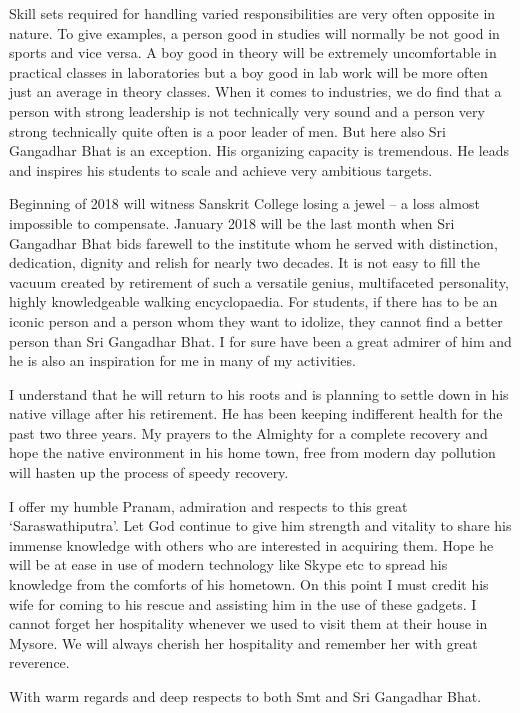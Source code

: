 Skill sets required for handling varied responsibilities are very often opposite in nature. To give examples, a person good in studies will normally be not good in sports and vice versa. A boy good in theory will be extremely uncomfortable in practical classes in laboratories but a boy good in lab work will be more often just an average in theory classes. When it comes to industries, we do find that a person with strong leadership is not technically very sound and a person very strong technically quite often is a poor leader of men. But here also Sri Gangadhar Bhat is an exception. His organizing capacity is tremendous. He leads and inspires his students to scale and achieve very ambitious targets.

Beginning of 2018 will witness Sanskrit College losing a jewel – a loss almost impossible to compensate. January 2018 will be the last month when Sri Gangadhar Bhat bids farewell to the institute whom he served with distinction, dedication, dignity and relish for nearly two decades. It is not easy to fill the vacuum created by retirement of such a versatile genius, multifaceted personality, highly knowledgeable walking encyclopaedia. For students, if there has to be an iconic person and a person whom they want to idolize, they cannot find a better person than Sri Gangadhar Bhat. I for sure have been a great admirer of him and he is also an inspiration for me in many of my activities.

I understand that he will return to his roots and is planning to settle down in his native village after his retirement. He has been keeping indifferent health for the past two three years. My prayers to the Almighty for a complete recovery and hope the native environment in his home town, free from modern day pollution will hasten up the process of speedy recovery.

I offer my humble Pranam, admiration and respects to this great ‘Saraswathiputra’. Let God continue to give him strength and vitality to share his immense knowledge with others who are interested in acquiring them. Hope he will be at ease in use of modern technology like Skype etc to spread his knowledge from the comforts of his hometown. On this point I must credit his wife for coming to his rescue and assisting him in the use of these gadgets. I cannot forget her hospitality whenever we used to visit them at their house in Mysore. We will always cherish her hospitality and remember her with great reverence.

With warm regards and deep respects to both Smt and Sri Gangadhar Bhat.

